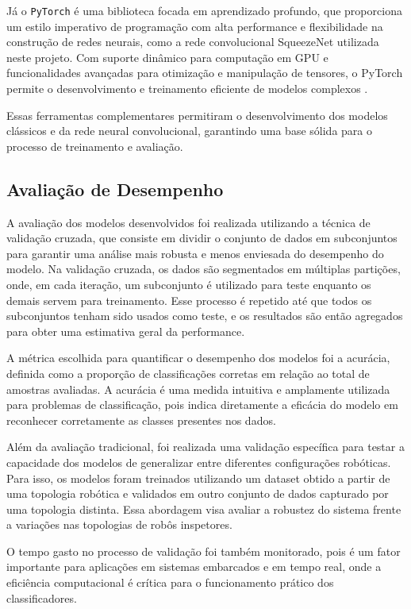 Já o \texttt{PyTorch} é uma biblioteca focada em aprendizado profundo, que proporciona um estilo imperativo de programação com alta performance e flexibilidade na construção de redes neurais, como a rede convolucional SqueezeNet utilizada neste projeto. Com suporte dinâmico para computação em GPU e funcionalidades avançadas para otimização e manipulação de tensores, o PyTorch permite o desenvolvimento e treinamento eficiente de modelos complexos \cite{NEURIPS2019_9015}.

Essas ferramentas complementares permitiram o desenvolvimento dos modelos clássicos e da rede neural convolucional, garantindo uma base sólida para o processo de treinamento e avaliação.

\subsection{Avaliação de Desempenho}

A avaliação dos modelos desenvolvidos foi realizada utilizando a técnica de validação cruzada, que consiste em dividir o conjunto de dados em subconjuntos para garantir uma análise mais robusta e menos enviesada do desempenho do modelo. Na validação cruzada, os dados são segmentados em múltiplas partições, onde, em cada iteração, um subconjunto é utilizado para teste enquanto os demais servem para treinamento. Esse processo é repetido até que todos os subconjuntos tenham sido usados como teste, e os resultados são então agregados para obter uma estimativa geral da performance.

A métrica escolhida para quantificar o desempenho dos modelos foi a acurácia, definida como a proporção de classificações corretas em relação ao total de amostras avaliadas. A acurácia é uma medida intuitiva e amplamente utilizada para problemas de classificação, pois indica diretamente a eficácia do modelo em reconhecer corretamente as classes presentes nos dados.

Além da avaliação tradicional, foi realizada uma validação específica para testar a capacidade dos modelos de generalizar entre diferentes configurações robóticas. Para isso, os modelos foram treinados utilizando um dataset obtido a partir de uma topologia robótica e validados em outro conjunto de dados capturado por uma topologia distinta. Essa abordagem visa avaliar a robustez do sistema frente a variações nas topologias de robôs inspetores.

O tempo gasto no processo de validação foi também monitorado, pois é um fator importante para aplicações em sistemas embarcados e em tempo real, onde a eficiência computacional é crítica para o funcionamento prático dos classificadores.

